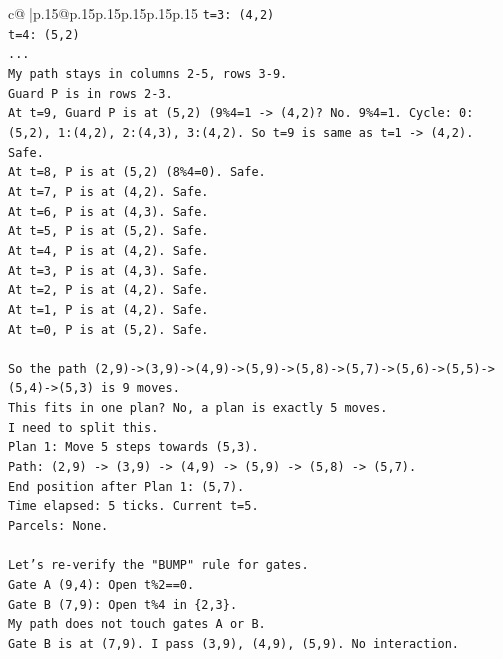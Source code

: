 \documentclass{article}
\begin{document}
{\begin{supertabular}{c@{$\;$}|p{.15\linewidth}@{}p{.15\linewidth}p{.15\linewidth}p{.15\linewidth}p{.15\linewidth}p{.15\linewidth}}
{{{\texttt{t=3: (4,2)} \\
\texttt{t=4: (5,2)} \\
\texttt{...} \\
\texttt{My path stays in columns 2{-}5, rows 3{-}9.} \\
\texttt{Guard P is in rows 2{-}3.} \\
\texttt{At t=9, Guard P is at (5,2) (9\%4=1 {-}> (4,2)? No. 9\%4=1. Cycle: 0:(5,2), 1:(4,2), 2:(4,3), 3:(4,2). So t=9 is same as t=1 {-}> (4,2). Safe.} \\
\texttt{At t=8, P is at (5,2) (8\%4=0). Safe.} \\
\texttt{At t=7, P is at (4,2). Safe.} \\
\texttt{At t=6, P is at (4,3). Safe.} \\
\texttt{At t=5, P is at (5,2). Safe.} \\
\texttt{At t=4, P is at (4,2). Safe.} \\
\texttt{At t=3, P is at (4,3). Safe.} \\
\texttt{At t=2, P is at (4,2). Safe.} \\
\texttt{At t=1, P is at (4,2). Safe.} \\
\texttt{At t=0, P is at (5,2). Safe.} \\
\\ 
\texttt{So the path (2,9){-}>(3,9){-}>(4,9){-}>(5,9){-}>(5,8){-}>(5,7){-}>(5,6){-}>(5,5){-}>(5,4){-}>(5,3) is 9 moves.} \\
\texttt{This fits in one plan? No, a plan is exactly 5 moves.} \\
\texttt{I need to split this.} \\
\texttt{Plan 1: Move 5 steps towards (5,3).} \\
\texttt{Path: (2,9) {-}> (3,9) {-}> (4,9) {-}> (5,9) {-}> (5,8) {-}> (5,7).} \\
\texttt{End position after Plan 1: (5,7).} \\
\texttt{Time elapsed: 5 ticks. Current t=5.} \\
\texttt{Parcels: None.} \\
\\ 
\texttt{Let's re{-}verify the "BUMP" rule for gates.} \\
\texttt{Gate A (9,4): Open t\%2==0.} \\
\texttt{Gate B (7,9): Open t\%4 in \{2,3\}.} \\
\texttt{My path does not touch gates A or B.} \\
\texttt{Gate B is at (7,9). I pass (3,9), (4,9), (5,9). No interaction.} \\
}}}
\end{supertabular}}
\end{document}

